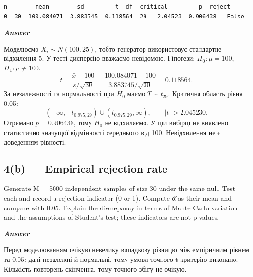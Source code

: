 \documentclass[11pt]{article}
\begin{document}
    
    \begin{Verbatim}[commandchars=\\\{\}]
    n        mean        sd         t  df  critical         p  reject
0  30  100.084071  3.883745  0.118564  29   2.04523  0.906438   False
    \end{Verbatim}

    
    \textbf{\emph{Answer}}

Моделюємо \(X_i\sim N(100,25)\), тобто генератор використовує стандартне
відхилення 5. У тесті дисперсію вважаємо невідомою. Гіпотези:
\(H_0:\mu=100\), \(H_1:\mu\ne100\).
\[t=\frac{\bar x-100}{s/\sqrt{30}}=\frac{100.084071-100}{3.883745/\sqrt{30}}=0.118564.\]
За незалежності та нормальності при \(H_0\) маємо \(T\sim t_{29}\).
Критична область рівня 0.05:
\[(-\infty,-t_{0.975,29})\cup(t_{0.975,29},\infty),\qquad |t|>2.045230.\]
Отримано \(p=0.906438\), тому \(H_0\) не відхиляємо. У цій вибірці не
виявлено статистично значущої відмінності середнього від 100.
Невідхилення не є доведенням рівності.

    \subsection{4(b) --- Empirical rejection
rate}\label{b-empirical-rejection-rate}

Generate M = 5000 independent samples of size 30 under the same null.
Test each and record a rejection indicator (0 or 1). Compute α̂ as their
mean and compare with 0.05. Explain the discrepancy in terms of Monte
Carlo variation and the assumptions of Student's test; these indicators
are not p-values.

    \textbf{\emph{Answer}}

Перед моделюванням очікую невелику випадкову різницю між емпіричним
рівнем та \(0.05\): дані незалежні й нормальні, тому умови точного
t-критерію виконано. Кількість повторень скінченна, тому точного збігу
не очікую.
\end{document}
